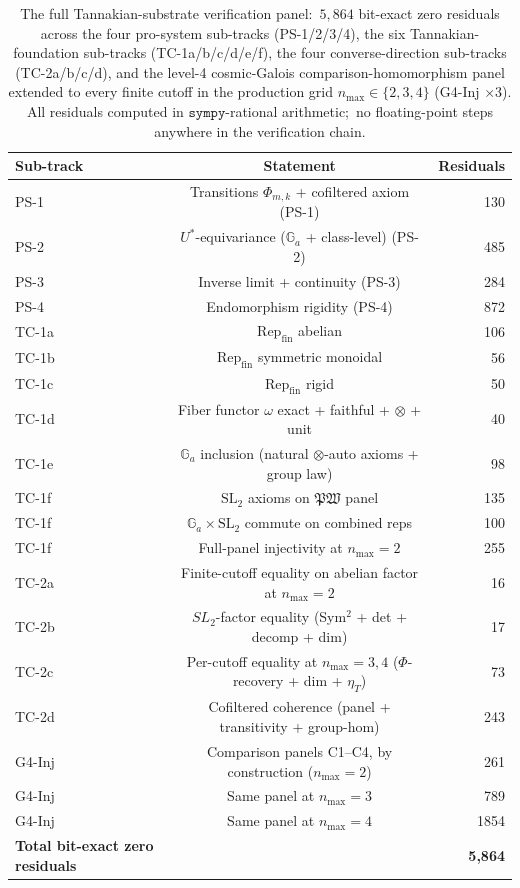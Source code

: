 \documentclass[11pt,a4paper]{article}
\theoremstyle{plain}
\theoremstyle{definition}
\newcommand{\nmax}{n_{\max}}
\newcommand{\Repcat}{\mathrm{Rep}_{\mathrm{fin}}}
\newcommand{\SL}{\mathrm{SL}}
\newcommand{\Ga}{\mathbb{G}_{a}}
\newcommand{\Ustar}{U^{*}}
\newcommand{\fibfun}{\omega}
\begin{document}
\begin{table}[h]
\centering
\begin{tabular}{l c r}
\toprule
Sub-track & Statement & Residuals \\
\midrule
PS-1 & Transitions $\Phi_{m, k}$ + cofiltered axiom (PS-1) & 130 \\
PS-2 & $\Ustar$-equivariance ($\Ga$ + class-level) (PS-2) & 485 \\
PS-3 & Inverse limit + continuity (PS-3) & 284 \\
PS-4 & Endomorphism rigidity (PS-4) & 872 \\
TC-1a & $\Repcat$ abelian & 106 \\
TC-1b & $\Repcat$ symmetric monoidal & 56 \\
TC-1c & $\Repcat$ rigid & 50 \\
TC-1d & Fiber functor $\fibfun$ exact + faithful + $\otimes$ + unit & 40 \\
TC-1e & $\Ga$ inclusion (natural $\otimes$-auto axioms + group law) & 98 \\
TC-1f & $\SL_{2}$ axioms on $\mathfrak{PW}$ panel & 135 \\
TC-1f & $\Ga \times \SL_{2}$ commute on combined reps & 100 \\
TC-1f & Full-panel injectivity at $\nmax = 2$ & 255 \\
TC-2a & Finite-cutoff equality on abelian factor at $\nmax = 2$ & 16 \\
TC-2b & $SL_{2}$-factor equality (Sym$^{2}$ + det + decomp + dim) & 17 \\
TC-2c & Per-cutoff equality at $\nmax = 3, 4$ ($\Phi$-recovery + dim + $\eta_{T}$) & 73 \\
TC-2d & Cofiltered coherence (panel + transitivity + group-hom) & 243 \\
G4-Inj & Comparison panels C1--C4, by construction ($\nmax = 2$) & 261 \\
G4-Inj & Same panel at $\nmax = 3$ & 789 \\
G4-Inj & Same panel at $\nmax = 4$ & 1854 \\
\midrule
\textbf{Total bit-exact zero residuals} & & \textbf{5{,}864} \\
\bottomrule
\end{tabular}
\caption{The full Tannakian-substrate verification panel:\
$5{,}864$ bit-exact zero residuals across the four pro-system
sub-tracks (PS-1/2/3/4), the six Tannakian-foundation sub-tracks
(TC-1a/b/c/d/e/f), the four converse-direction sub-tracks
(TC-2a/b/c/d), and the level-4 cosmic-Galois comparison-homomorphism panel
extended to every finite cutoff in the production grid
$\nmax \in \{2, 3, 4\}$ (G4-Inj $\times 3$). All residuals computed
in $\texttt{sympy}$-rational arithmetic;\ no floating-point steps
anywhere in the verification chain.}
\label{tab:verification}
\end{table}
\end{document}
